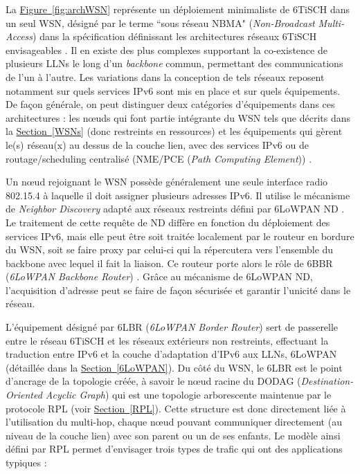\documentclass[]{report}
\newcommand{\wordlink}[2]{\hyperref[#2]{#1~\ref{#2}}}
\begin{document}
La \wordlink{Figure}{fig:archWSN} représente un déploiement minimaliste de 6TiSCH dans un seul WSN, désigné par le terme ``sous réseau NBMA" (\textit{Non-Broadcast Multi-Access}) dans la spécification définissant les architectures réseaux 6TiSCH envisageables \cite{ietf-6tisch-architecture-28}. Il en existe des plus complexes supportant la co-existence de plusieurs LLNs le long d'un \textit{backbone} commun, permettant des communications de l'un à l'autre. Les variations dans la conception de tels réseaux reposent notamment sur quels services IPv6 sont mis en place et sur quels équipements. De façon générale, on peut distinguer deux catégories d'équipements dans ces architectures : les nœuds qui font partie intégrante du WSN tels que décrits dans la \wordlink{Section}{WSNs} (donc restreints en ressources) et les équipements qui gèrent le(s) réseau(x) au dessus de la couche lien, avec des services IPv6 ou de routage/scheduling centralisé (NME/PCE (\textit{Path Computing Element})) \cite{ietf-6tisch-architecture-28}.\\

\par Un nœud rejoignant le WSN possède généralement une seule interface radio 802.15.4 à laquelle il doit assigner plusieurs adresses IPv6. Il utilise le mécanisme de \textit{Neighbor Discovery} adapté aux réseaux restreints défini par 6LoWPAN ND \cite{rfc6775} \cite{rfc8505}. Le traitement de cette requête de ND diffère en fonction du déploiement des services IPv6, mais elle peut être soit traitée localement par le routeur en bordure du WSN, soit se faire proxy par celui-ci qui la répercutera vers l'ensemble du backbone avec lequel il fait la liaison. Ce routeur porte alors le rôle de 6BBR (\textit{6LoWPAN Backbone Router}) \cite{ietf-6lo-backbone-router-13}. Grâce au mécanisme de 6LoWPAN ND, l'acquisition d'adresse peut se faire de façon sécurisée et garantir l'unicité dans le réseau.

\newpage

\par L'équipement désigné par 6LBR (\textit{6LoWPAN Border Router}) sert de passerelle entre le réseau 6TiSCH et les réseaux extérieurs non restreints, effectuant la traduction entre IPv6 et la couche d'adaptation d'IPv6 aux LLNs, 6LoWPAN (détaillée dans la \wordlink{Section}{6LoWPAN}). Du côté du WSN, le 6LBR est le point d'ancrage de la topologie créée, à savoir le nœud racine du DODAG (\textit{Destination-Oriented Acyclic Graph}) qui est une topologie arborescente maintenue par le protocole RPL (voir \wordlink{Section}{RPL}). Cette structure est donc directement liée à l'utilisation du multi-hop, chaque nœud pouvant communiquer directement (au niveau de la couche lien) avec son parent ou un de ses enfants. Le modèle ainsi défini par RPL permet d'envisager trois types de trafic qui ont des applications typiques \cite{rfc7554} \cite{rfc6550} :\\
\end{document}
